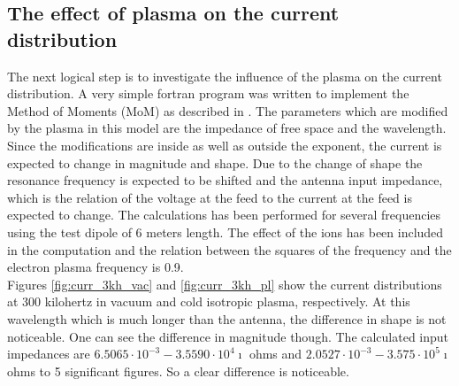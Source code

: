 \documentclass[a4paper,11pt]{thesis}
\begin{document}
\subsection{The effect of plasma on the current distribution}
The next logical step is to investigate the influence of the plasma on the current distribution. A very simple fortran program was written to implement the Method of Moments (MoM) as described in \cite{kraus}. The parameters which are modified by the plasma in this model are the impedance of free space and the wavelength. Since the modifications are inside as well as outside the exponent, the current is expected to change in magnitude and shape. Due to the change of shape the resonance frequency is expected to be shifted and the antenna input impedance, which is the relation of the voltage at the feed to the current at the feed is expected to change. The calculations has been performed for several frequencies using the test dipole of 6 meters length. The effect of the ions has been included in the computation and the relation between the squares of the frequency and the electron plasma frequency is 0.9.\\

Figures \ref{fig:curr_3kh_vac} and \ref{fig:curr_3kh_pl} show the current distributions at 300 kilohertz in vacuum and cold isotropic plasma, respectively. At this wavelength which is much longer than the antenna, the difference in shape is not noticeable. One can see the difference in magnitude though. The calculated input impedances are $6.5065 \cdot 10^{-3} -3.5590\cdot 10^4\imath$ ohms and $2.0527\cdot 10^{-3} -3.575\cdot 10^5\imath$ ohms to 5 significant figures. So a clear difference is noticeable.\\
\end{document}
